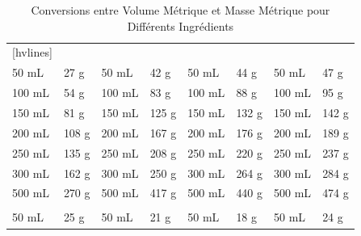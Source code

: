 \begin{table}
	\centering
	\caption{Conversions entre Volume Métrique et Masse Métrique pour Différents Ingrédients}
	\def\arraystretch{2}
	\begin{NiceTabular}{*{8}{m{.1\textwidth}}}[hvlines]
		         &       &      &       &        &       &                       \\
		50 mL                                  & 27 g  & 50 mL                                   & 42 g  & 50 mL                                    & 44 g  & 50 mL                                       & 47 g  \\
		100 mL                                 & 54 g  & 100 mL                                  & 83 g  & 100 mL                                   & 88 g  & 100 mL                                      & 95 g  \\
		150 mL                                 & 81 g  & 150 mL                                  & 125 g & 150 mL                                   & 132 g & 150 mL                                      & 142 g \\
		200 mL                                 & 108 g & 200 mL                                  & 167 g & 200 mL                                   & 176 g & 200 mL                                      & 189 g \\
		250 mL                                 & 135 g & 250 mL                                  & 208 g & 250 mL                                   & 220 g & 250 mL                                      & 237 g \\
		300 mL                                 & 162 g & 300 mL                                  & 250 g & 300 mL                                   & 264 g & 300 mL                                      & 284 g \\
		500 mL                                 & 270 g & 500 mL                                  & 417 g & 500 mL                                   & 440 g & 500 mL                                      & 474 g \\
		            &       &            &       &  &       &                    \\
		50 mL                                  & 25 g  & 50 mL                                   & 21 g  & 50 mL                                    & 18 g  & 50 mL                                       & 24 g  \\

\end{NiceTabular}
\end{table}
